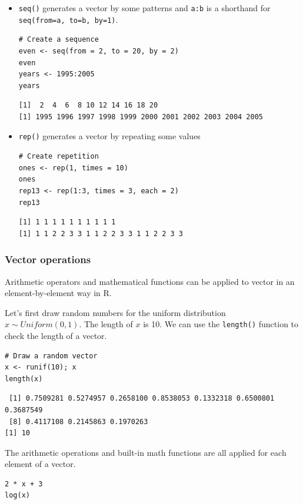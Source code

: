 \documentclass[a4paper,11pt]{article}
\begin{document}
\begin{itemize}
\item \texttt{seq()} generates a vector by some patterns and \texttt{a:b} is a shorthand
for \texttt{seq(from=a, to=b, by=1)}.

\begin{verbatim}
# Create a sequence
even <- seq(from = 2, to = 20, by = 2)
even
years <- 1995:2005
years
\end{verbatim}

\begin{verbatim}
[1]  2  4  6  8 10 12 14 16 18 20
[1] 1995 1996 1997 1998 1999 2000 2001 2002 2003 2004 2005
\end{verbatim}

\item \texttt{rep()} generates a vector by repeating some values

\begin{verbatim}
# Create repetition
ones <- rep(1, times = 10)
ones
rep13 <- rep(1:3, times = 3, each = 2)
rep13
\end{verbatim}

\begin{verbatim}
[1] 1 1 1 1 1 1 1 1 1 1
[1] 1 1 2 2 3 3 1 1 2 2 3 3 1 1 2 2 3 3
\end{verbatim}
\end{itemize}

\subsubsection*{Vector operations}
\label{sec:orgee63d64}

Arithmetic operators and mathematical functions can be applied to
vector in an element-by-element way in R.

Let's first draw random numbers for the uniform distribution
\(x \sim Uniform(0, 1)\). The length of \(x\) is 10. We can use the
\texttt{length()} function to check the length of a vector.

\begin{verbatim}
# Draw a random vector
x <- runif(10); x
length(x)
\end{verbatim}

\begin{verbatim}
 [1] 0.7509281 0.5274957 0.2658100 0.8538053 0.1332318 0.6500801 0.3687549
 [8] 0.4117108 0.2145863 0.1970263
[1] 10
\end{verbatim}

The arithmetic operations and built-in math functions are all applied
for each element of a vector.
\begin{verbatim}
2 * x + 3
log(x)
\end{verbatim}
\end{document}
